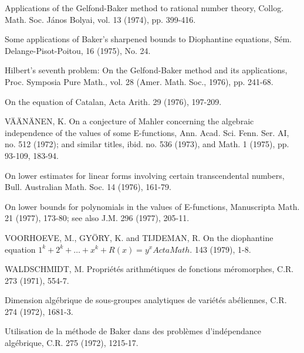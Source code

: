 \begin{hanglist}
    \item \hspace{1.5em} Applications of the Gelfond-Baker method to rational number theory, Collog. Math. Soc. János Bolyai, vol. 13 (1974), pp. 399-416.
    \item \hspace{1.5em} Some applications of Baker's sharpened bounds to Diophantine equations, Sém. Delange-Pisot-Poitou, 16 (1975), No. 24.
    \item \hspace{1.5em} Hilbert's seventh problem: On the Gelfond-Baker method and its applications, Proc. Symposia Pure Math., vol. 28 (Amer. Math. Soc., 1976), pp. 241-68.
    \item \hspace{1.5em} On the equation of Catalan, Acta Arith. 29 (1976), 197-209.
    \item VÄÄNÄNEN, K. On a conjecture of Mahler concerning the algebraic independence of the values of some E-functions, Ann. Acad. Sci. Fenn. Ser. AI, no. 512 (1972); and similar titles, ibid. no. 536 (1973), and Math. 1 (1975), pp. 93-109, 183-94.
    \item \hspace{1.5em} On lower estimates for linear forms involving certain transcendental numbers, Bull. Australian Math. Soc. 14 (1976), 161-79.
    \item \hspace{1.5em} On lower bounds for polynomials in the values of E-functions, Manuscripta Math. 21 (1977), 173-80; see also J.M. 296 (1977), 205-11.
    \item VOORHOEVE, M., GYÖRY, K. and TIJDEMAN, R. On the diophantine equation  $1^k + 2^k + \ldots + x^k + R(x) = y^x Acta Math.$  143 (1979), 1-8.
    \item WALDSCHMIDT, M. Propriétés arithmétiques de fonctions méromorphes, C.R. 273 (1971), 554-7.
    \item \hspace{1.5em} Dimension algébrique de sous-groupes analytiques de variétés abéliennes, C.R. 274 (1972), 1681-3.
    \item \hspace{1.5em} Utilisation de la méthode de Baker dans des problèmes d'indépendance algébrique, C.R. 275 (1972), 1215-17.

\end{hanglist}
